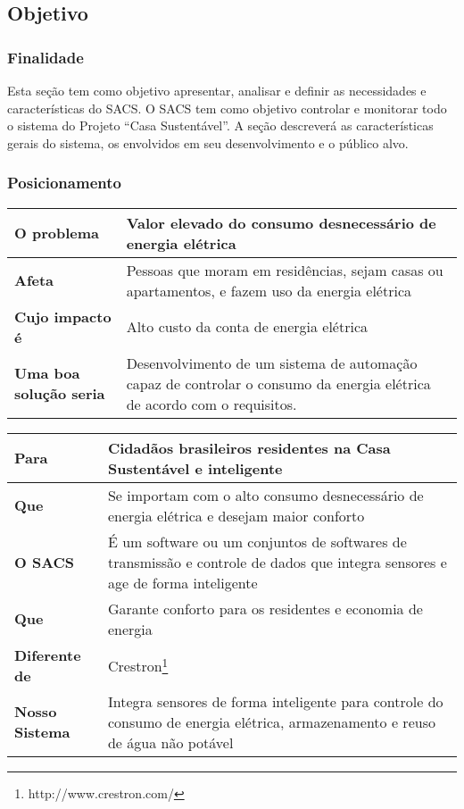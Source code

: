 \subsection{Objetivo}

\subsubsection{Finalidade}

Esta seção tem como objetivo apresentar, analisar e definir as necessidades e características do SACS. O
SACS tem como objetivo controlar e monitorar todo o sistema do Projeto “Casa Sustentável”. A seção
descreverá as características gerais do sistema, os envolvidos em seu desenvolvimento e o público alvo.

\subsubsection{Posicionamento}


\begin{longtable}{|l|m{7cm}|}
	\hline \textbf{O problema} & Valor elevado do consumo desnecessário de energia elétrica\\
	\hline \textbf{Afeta} & Pessoas que moram em residências, sejam casas ou apartamentos, e fazem uso da energia
	elétrica\\
	\hline \textbf{Cujo impacto é} & Alto custo da conta de energia elétrica\\
	\hline \textbf{Uma boa solução seria} & Desenvolvimento de um sistema de automação capaz de controlar o consumo
	da energia elétrica de acordo com o requisitos.\\
	\hline
\end{longtable}


\begin{longtable}{|l|m{7cm}|}
	\hline \textbf{Para} & Cidadãos brasileiros residentes na Casa Sustentável e inteligente \\
	\hline \textbf{Que} & Se importam com o alto consumo desnecessário de energia elétrica e desejam maior conforto\\
	\hline \textbf{O SACS} & É um software ou um conjuntos de softwares de transmissão e controle de dados que
	integra sensores e age de forma inteligente\\
	\hline \textbf{Que} & Garante conforto para os residentes e economia de energia\\
	\hline \textbf{Diferente de} & Crestron\footnote{http://www.crestron.com/}\\
	\hline \textbf{Nosso Sistema} & Integra sensores de forma inteligente para controle do consumo de energia elétrica,
	armazenamento e reuso de água não potável\\
	\hline
\end{longtable}

